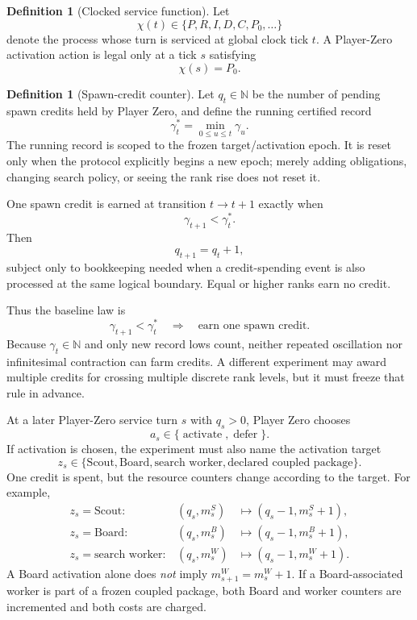 \documentclass[11pt]{article}
\theoremstyle{definition}
\newtheorem{definition}[theorem]{Definition}
\begin{document}
\begin{definition}[Clocked service function]
Let
\[
\chi(t)\in\{P,R,I,D,C,P_0,\ldots\}
\]
denote the process whose turn is serviced at global clock tick $t$. A Player-Zero activation action is legal only at a tick $s$ satisfying
\[
\chi(s)=P_0.
\]
\end{definition}

\begin{definition}[Spawn-credit counter]
Let $q_t\in\mathbb N$ be the number of pending spawn credits held by Player Zero, and define the running certified record
\[
\gamma_t^*=\min_{0\le u\le t}\gamma_u.
\]
The running record is scoped to the frozen target/activation epoch. It is reset only when the protocol explicitly begins a new epoch; merely adding obligations, changing search policy, or seeing the rank rise does not reset it.

One spawn credit is earned at transition $t\to t+1$ exactly when
\[
\gamma_{t+1}<\gamma_t^*.
\]
Then
\[
q_{t+1}=q_t+1,
\]
subject only to bookkeeping needed when a credit-spending event is also processed at the same logical boundary. Equal or higher ranks earn no credit.
\end{definition}

Thus the baseline law is
\[
\boxed{\gamma_{t+1}<\gamma_t^*\quad\Longrightarrow\quad\text{earn one spawn credit}.}
\]
Because $\gamma_t\in\mathbb N$ and only new record lows count, neither repeated oscillation nor infinitesimal contraction can farm credits. A different experiment may award multiple credits for crossing multiple discrete rank levels, but it must freeze that rule in advance.

At a later Player-Zero service turn $s$ with $q_s>0$, Player Zero chooses
\[
a_s\in\{\operatorname{activate},\operatorname{defer}\}.
\]
If activation is chosen, the experiment must also name the activation target
\[
z_s\in\{\text{Scout},\text{Board},\text{search worker},\text{declared coupled package}\}.
\]
One credit is spent, but the resource counters change according to the target. For example,
\[
\begin{array}{rcl}
z_s=\text{Scout}:&(q_s,m_s^S)&\mapsto(q_s-1,m_s^S+1),\\[2pt]
z_s=\text{Board}:&(q_s,m_s^B)&\mapsto(q_s-1,m_s^B+1),\\[2pt]
z_s=\text{search worker}:&(q_s,m_s^W)&\mapsto(q_s-1,m_s^W+1).
\end{array}
\]
A Board activation alone does \emph{not} imply $m_{s+1}^{W}=m_s^{W}+1$. If a Board-associated worker is part of a frozen coupled package, both Board and worker counters are incremented and both costs are charged.
\end{document}
